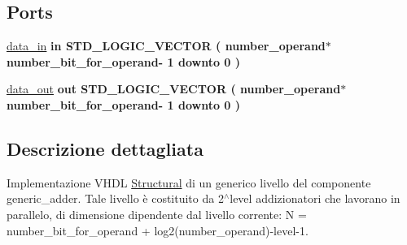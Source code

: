 \subsection*{Ports}
 \begin{DoxyCompactItemize}
\item 
\hypertarget{classadder__block_ga5a138d36775773e82950ee12e1f944de}{\hyperlink{group___majority_voter_ga5a138d36775773e82950ee12e1f944de}{data\+\_\+in}  {\bfseries {\bfseries \textcolor{vhdlchar}{in}\textcolor{vhdlchar}{ }}} {\bfseries \textcolor{vhdlchar}{S\+T\+D\+\_\+\+L\+O\+G\+I\+C\+\_\+\+V\+E\+C\+T\+O\+R}\textcolor{vhdlchar}{ }\textcolor{vhdlchar}{(}\textcolor{vhdlchar}{ }\textcolor{vhdlchar}{ }\textcolor{vhdlchar}{ }\textcolor{vhdlchar}{ }\textcolor{vhdlchar}{number\+\_\+operand}\textcolor{vhdlchar}{$\ast$}\textcolor{vhdlchar}{ }\textcolor{vhdlchar}{ }\textcolor{vhdlchar}{ }\textcolor{vhdlchar}{number\+\_\+bit\+\_\+for\+\_\+operand}\textcolor{vhdlchar}{-\/}\textcolor{vhdlchar}{ } \textcolor{vhdldigit}{1} \textcolor{vhdlchar}{ }\textcolor{vhdlchar}{downto}\textcolor{vhdlchar}{ }\textcolor{vhdlchar}{ } \textcolor{vhdldigit}{0} \textcolor{vhdlchar}{ }\textcolor{vhdlchar}{)}\textcolor{vhdlchar}{ }} }\label{classadder__block_ga5a138d36775773e82950ee12e1f944de}

\item 
\hypertarget{classadder__block_ga55e1fcd272414c24dc7f669e0050e8cc}{\hyperlink{group___majority_voter_ga55e1fcd272414c24dc7f669e0050e8cc}{data\+\_\+out}  {\bfseries {\bfseries \textcolor{vhdlchar}{out}\textcolor{vhdlchar}{ }}} {\bfseries \textcolor{vhdlchar}{S\+T\+D\+\_\+\+L\+O\+G\+I\+C\+\_\+\+V\+E\+C\+T\+O\+R}\textcolor{vhdlchar}{ }\textcolor{vhdlchar}{(}\textcolor{vhdlchar}{ }\textcolor{vhdlchar}{ }\textcolor{vhdlchar}{ }\textcolor{vhdlchar}{ }\textcolor{vhdlchar}{number\+\_\+operand}\textcolor{vhdlchar}{$\ast$}\textcolor{vhdlchar}{ }\textcolor{vhdlchar}{ }\textcolor{vhdlchar}{ }\textcolor{vhdlchar}{number\+\_\+bit\+\_\+for\+\_\+operand}\textcolor{vhdlchar}{-\/}\textcolor{vhdlchar}{ } \textcolor{vhdldigit}{1} \textcolor{vhdlchar}{ }\textcolor{vhdlchar}{downto}\textcolor{vhdlchar}{ }\textcolor{vhdlchar}{ } \textcolor{vhdldigit}{0} \textcolor{vhdlchar}{ }\textcolor{vhdlchar}{)}\textcolor{vhdlchar}{ }} }\label{classadder__block_ga55e1fcd272414c24dc7f669e0050e8cc}

\end{DoxyCompactItemize}


\subsection{Descrizione dettagliata}
Implementazione V\+H\+D\+L \hyperlink{classadder__block_1_1_structural}{Structural} di un generico livello del componente generic\+\_\+adder. Tale livello è costituito da 2$^\wedge$level addizionatori che lavorano in parallelo, di dimensione dipendente dal livello corrente\+: N = number\+\_\+bit\+\_\+for\+\_\+operand + log2(number\+\_\+operand)-\/level-\/1. 


